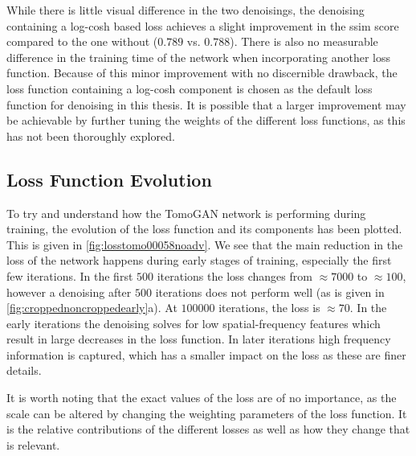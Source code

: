 While there is little visual difference in the two denoisings, the denoising containing a log-cosh based loss achieves a slight improvement in the \gls{ssim} score compared to the one without ($0.789$ vs. $0.788$). There is also no measurable difference in the training time of the network when incorporating another loss function. Because of this minor improvement with no discernible drawback, the loss function containing a log-cosh component is chosen as the default loss function for denoising in this thesis. It is possible that a larger improvement may be achievable by further tuning the weights of the different loss functions, as this has not been thoroughly explored. 

\subsection{Loss Function Evolution}
To try and understand how the TomoGAN network is performing during training, the evolution of the loss function and its components has been plotted. This is given in \cref{fig:losstomo00058noadv}. We see that the main reduction in the loss of the network happens during early stages of training, especially the first few iterations. In the first $500$ iterations the loss changes from $\approx 7000$ to $\approx 100$, however a denoising after $500$ iterations does not perform well (as is given in \cref{fig:croppednoncroppedearly}a). At $100000$ iterations, the loss is $\approx 70$. In the early iterations the denoising solves for low spatial-frequency features which result in large decreases in the loss function. In later iterations high frequency information is captured, which has a smaller impact on the loss as these are finer details. 

It is worth noting that the exact values of the loss are of no importance, as the scale can be altered by changing the weighting parameters of the loss function. It is the relative contributions of the different losses as well as how they change that is relevant. 

